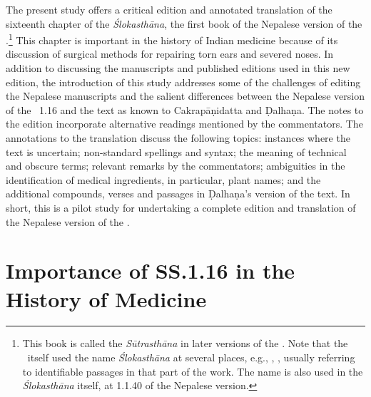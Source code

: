 The present study offers a critical edition and annotated translation of the
sixteenth chapter of the \emph{Ślokasthāna}, the first book of the Nepalese
version of the \SS.\footnote{This book is called the \emph{Sūtrasthāna} in later
    versions of the \SS.  Note that the \SS\ itself used the name \emph{Ślokasthāna}
    at several places, e.g., , , usually
    referring to identifiable passages in that part of the work. The name is also used
    in the \emph{Ślokasthāna} itself, at 1.1.40 of the Nepalese version.} 
%  
This chapter is important in the history of Indian medicine because of its
discussion of surgical methods for repairing torn ears and severed noses. In
addition to discussing the manuscripts and published editions used in this new
edition, the introduction of this study addresses some of the challenges of
editing the Nepalese manuscripts and the salient differences between the Nepalese
version of the \SS\ 1.16 and the text as known to Cakrapāṇidatta and Ḍalhaṇa. The
notes to the edition incorporate alternative readings mentioned by the
commentators.  The annotations to the translation discuss the following topics:
instances where the text is uncertain; non-standard spellings and syntax; the
meaning of technical and obscure terms; relevant remarks by the commentators;
ambiguities in the identification of medical ingredients, in particular, plant
names; and the additional compounds, verses and passages in Ḍalhaṇa's version of
the text. In short, this is a pilot study for undertaking a complete edition and
translation of the Nepalese version of the \SS.


\section{Importance of SS.1.16 in the History of Medicine}


